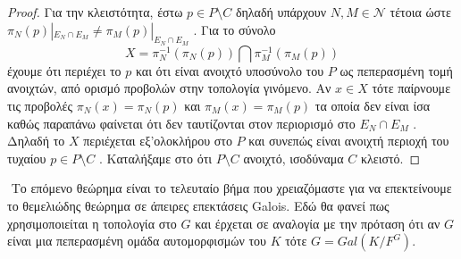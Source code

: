 \documentclass[oneside,a4paper]{article}
\newcommand {\tl}{\textlatin}
\begin{document}
\begin{proof}
Για την κλειστότητα, έστω $p \in P\setminus C$ δηλαδή υπάρχουν $N,M \in \mathcal{N}$ τέτοια ώστε $\pi_N (p) |_{E_N \cap E_M} \neq \pi_M (p) |_{E_N \cap E_M}$ . Για το σύνολο
$$X = \pi^{-1}_N \left(\pi_N \left( p \right) \right) \bigcap \pi^{-1}_M \left(\pi_M \left( p \right) \right)$$
έχουμε ότι περιέχει το $p$ και ότι είναι ανοιχτό υποσύνολο του $P$ ως πεπερασμένη τομή ανοιχτών, από ορισμό προβολών στην τοπολογία γινόμενο. Αν $x \in X$ τότε παίρνουμε τις προβολές $\pi_N(x) = \pi_N (p)$ και $\pi_M (x) = \pi_M (p)$ τα οποία δεν είναι ίσα καθώς παραπάνω φαίνεται ότι δεν ταυτίζονται στον περιορισμό στο $E_N \cap E_M$ . Δηλαδή το $X$ περιέχεται εξ'ολοκλήρου στο $P$ και συνεπώς είναι ανοιχτή περιοχή του τυχαίου $p \in P\setminus C$ . Καταλήξαμε στο ότι $P\setminus C$ ανοιχτό, ισοδύναμα $C$ κλειστό.
\end{proof}

$ $\newline
\noindent Το επόμενο θεώρημα είναι το τελευταίο βήμα που χρειαζόμαστε για να επεκτείνουμε το θεμελιώδης θεώρημα σε άπειρες επεκτάσεις \tl{Galois}. Εδώ θα φανεί πως χρησιμοποιείται η τοπολογία στο $G$ και έρχεται σε αναλογία με την πρόταση ότι αν $G$ είναι μια πεπερασμένη ομάδα αυτομορφισμών του $K$ τότε $G = Gal(K/F^G)$.
\end{document}
